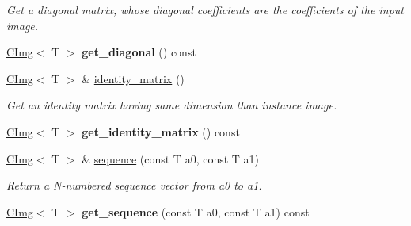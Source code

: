 \begin{DoxyCompactItemize}
\begin{DoxyCompactList}\small\item\em Get a diagonal matrix, whose diagonal coefficients are the coefficients of the input image. \item\end{DoxyCompactList}\item 
\hypertarget{structcimg__library_1_1CImg_a5556dfbb562455d3d196295c1ca6e0e0}{
\hyperlink{structcimg__library_1_1CImg}{CImg}$<$ T $>$ {\bfseries get\_\-diagonal} () const }
\label{structcimg__library_1_1CImg_a5556dfbb562455d3d196295c1ca6e0e0}

\item 
\hypertarget{structcimg__library_1_1CImg_a187aa670727bb4d1a9160702fcf9a418}{
\hyperlink{structcimg__library_1_1CImg}{CImg}$<$ T $>$ \& \hyperlink{structcimg__library_1_1CImg_a187aa670727bb4d1a9160702fcf9a418}{identity\_\-matrix} ()}
\label{structcimg__library_1_1CImg_a187aa670727bb4d1a9160702fcf9a418}

\begin{DoxyCompactList}\small\item\em Get an identity matrix having same dimension than instance image. \item\end{DoxyCompactList}\item 
\hypertarget{structcimg__library_1_1CImg_a511692deba5af28d058753c4daed1bc1}{
\hyperlink{structcimg__library_1_1CImg}{CImg}$<$ T $>$ {\bfseries get\_\-identity\_\-matrix} () const }
\label{structcimg__library_1_1CImg_a511692deba5af28d058753c4daed1bc1}

\item 
\hypertarget{structcimg__library_1_1CImg_af3adb54a3f492f7701a1feac9a6954aa}{
\hyperlink{structcimg__library_1_1CImg}{CImg}$<$ T $>$ \& \hyperlink{structcimg__library_1_1CImg_af3adb54a3f492f7701a1feac9a6954aa}{sequence} (const T a0, const T a1)}
\label{structcimg__library_1_1CImg_af3adb54a3f492f7701a1feac9a6954aa}

\begin{DoxyCompactList}\small\item\em Return a N-\/numbered sequence vector from {\ttfamily a0} to {\ttfamily a1}. \item\end{DoxyCompactList}\item 
\hypertarget{structcimg__library_1_1CImg_a2b0951189bd17a05ace85720d379537e}{
\hyperlink{structcimg__library_1_1CImg}{CImg}$<$ T $>$ {\bfseries get\_\-sequence} (const T a0, const T a1) const }
\label{structcimg__library_1_1CImg_a2b0951189bd17a05ace85720d379537e}


\end{DoxyCompactItemize}
